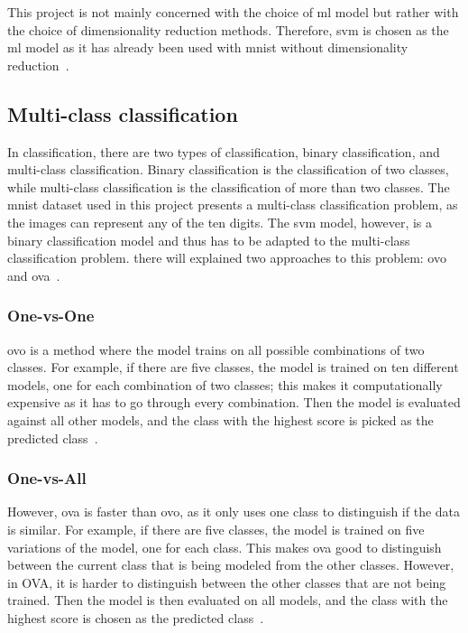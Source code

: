 This project is not mainly concerned with the choice of \gls{ml} model but rather with the choice of dimensionality reduction methods. Therefore, \gls{svm} is chosen as the \gls{ml} model as it has already been used with \gls{mnist} without dimensionality reduction~\cite{lecun-mnist-database}.



\subsection{Multi-class classification}\label{subsec:multi-class}
In classification, there are two types of classification, binary classification, and multi-class classification. Binary classification is the classification of two classes, while multi-class classification is the classification of more than two classes. The \gls{mnist} dataset used in this project presents a multi-class classification problem, as the images can represent any of the ten digits. The \gls{svm} model, however, is a binary classification model and thus has to be adapted to the multi-class classification problem. there will explained two approaches to this problem: \gls{ovo} and \gls{ova}~\cite{james-statistical-learning1}.

\subsubsection{One-vs-One}\label{subsubsec:one-vs-one}
\gls{ovo} is a method where the model trains on all possible combinations of two classes. For example, if there are five classes, the model is trained on ten different models, one for each combination of two classes; this makes it computationally expensive as it has to go through every combination. Then the model is evaluated against all other models, and the class with the highest score is picked as the predicted class~\cite{james-statistical-learning1}.

\subsubsection{One-vs-All}\label{subsubsec:one-vs-all}
However, \gls{ova} is faster than \gls{ovo}, as it only uses one class to distinguish if the data is similar. For example, if there are five classes, the model is trained on five variations of the model, one for each class. This makes \gls{ova} good to distinguish between the current class that is being modeled from the other classes. However, in OVA, it is harder to distinguish between the other classes that are not being trained. Then the model is then evaluated on all models, and the class with the highest score is chosen as the predicted class~\cite{james-statistical-learning1}.

